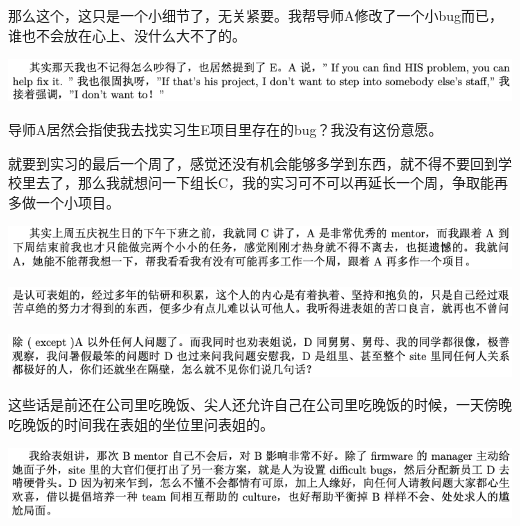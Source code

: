\documentclass[9pt, b5paper]{article}
\begin{document}
那么这个，这只是一个小细节了，无关紧要。我帮导师A修改了一个小bug而已，谁也不会放在心上、没什么大不了的。 

\begin{center}
\includegraphics[width=.9\linewidth]{./pic/backups_plans_20210514_125725.png}
\end{center}

导师A居然会指使我去找实习生E项目里存在的bug？我没有这份意愿。 

就要到实习的最后一个周了，感觉还没有机会能够多学到东西，就不得不要回到学校里去了，那么我就想问一下组长C，我的实习可不可以再延长一个周，争取能再多做一个小项目。 

\begin{center}
\includegraphics[width=.9\linewidth]{./pic/backups_plans_20210514_115101.png}
\end{center}

\begin{center}
\includegraphics[width=.9\linewidth]{./pic/backups_plans_20210514_115223.png}
\end{center}

\begin{center}
\includegraphics[width=.9\linewidth]{./pic/backups_plans_20210514_115233.png}
\end{center}

这些话是前还在公司里吃晚饭、尖人还允许自己在公司里吃晚饭的时候，一天傍晚吃晚饭的时间我在表姐的坐位里问表姐的。 

\begin{center}
\includegraphics[width=.9\linewidth]{./pic/backups_plans_20210514_115523.png}
\end{center}
\end{document}
